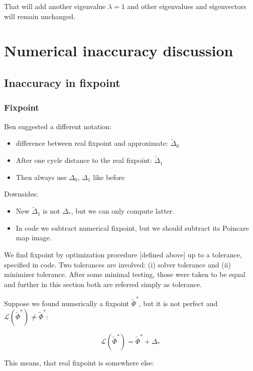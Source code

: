 \documentclass[a4paper,12pt]{article}
\newcommand{\wt}{\widetilde} %
\newcommand{\FP}{\Phi^*}%
\newcommand{\D}{\Delta}%
\begin{document}
   That will add another eigenvalue $\lambda=1$ and other eigenvalues and eigenvectors will remain unchanged.


\section*{Numerical inaccuracy discussion}

\subsection*{Inaccuracy in fixpoint}

\subsubsection*{Fixpoint}


\begin{itshape}
{\small 
Ben suggested a different notation:
\begin{itemize}
\item  difference between real fixpoint and approximate: $\wt \D_0$
\item  After one cycle distance to the real fixpoint: $\wt \D_1$
\item Then always use $\D_0$, $\D_1$ like before

\end{itemize}
Downsides:

\begin{itemize}
\item New $\wt \D_1$ is not $\D_*$, but we can only compute latter.
\item In code we subtract numerical fixpoint, but we should  subtract its Poincare map image.
\end{itemize}

}
\end{itshape}

We find fixpoint by optimization procedure [defined above] up to a tolerance, specified in code. Two tolerances are involved: (i) solver tolerance and (ii) minimizer tolerance. After some minimal testing, those were taken to be equal and further in this section both are referred simply as tolerance.

Suppose we found numerically a fixpoint $\wt \Phi^*$, but it is not perfect and $ \mathcal{L}(\wt \FP) \neq \wt \FP $:

$$ \mathcal{L}(\wt \FP) = \wt \FP + \D_*$$

This means, that real fixpoint is somewhere else:
\end{document}
